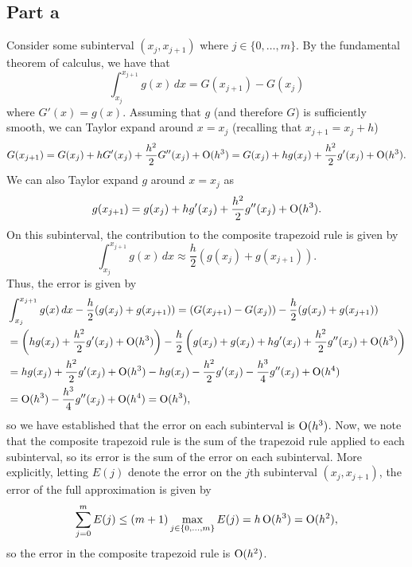 \documentclass{article}
\begin{document}
\subsection{Part a}
Consider some subinterval $(x_j,x_{j+1})$ where $j\in\{0,\ldots,m\}$. By the fundamental theorem of calculus, we have that 
\[
\int_{x_j}^{x_{j+1}} g(x)\,dx=G(x_{j+1})-G(x_j)
\]
where $G'(x)=g(x)$. Assuming that $g$ (and therefore $G$) is sufficiently smooth, we can Taylor expand around $x=x_j$ (recalling that $x_{j+1}=x_j+h$)
\[
G(x_{j+1})=G(x_j)+hG'(x_j)+\frac{h^2}{2}G''(x_j)+\operatorname{O}(h^3)=G(x_j)+hg(x_j)+\frac{h^2}{2}g'(x_j)+\operatorname{O}(h^3).
\]
We can also Taylor expand $g$ around $x=x_j$ as
\[
g(x_{j+1})=g(x_j)+hg'(x_j)+\frac{h^2}{2}g''(x_j)+\operatorname{O}(h^3).
\]
On this subinterval, the contribution to the composite trapezoid rule is given by \[
\int_{x_j}^{x_{j+1}} g(x)\,dx\approx\frac{h}{2}(g(x_{j})+g(x_{j+1})).
\]
Thus, the error is given by 
\begin{align*}
&\int_{x_j}^{x_{j+1}} g(x)\,dx-\frac{h}{2}(g(x_{j})+g(x_{j+1}))=(G(x_{j+1})-G(x_j))-\frac{h}{2}(g(x_{j})+g(x_{j+1}))\\&=
\left(hg(x_j)+\frac{h^2}{2}g'(x_j)+\operatorname{O}(h^3)\right)-\frac{h}{2}\left(g(x_{j})+g(x_j)+hg'(x_j)+\frac{h^2}{2}g''(x_j)+\operatorname{O}(h^3)\right)\\&=
hg(x_j)+\frac{h^2}{2}g'(x_j)+\operatorname{O}(h^3)-hg(x_j)-\frac{h^2}{2}g'(x_j)-\frac{h^3}{4}g''(x_j)+\operatorname{O}(h^4)\\&=
\operatorname{O}(h^3)-\frac{h^3}{4}g''(x_j)+\operatorname{O}(h^4)=\operatorname{O}(h^3),
\end{align*}
so we have established that the error on each subinterval is $\operatorname{O}(h^3)$. Now, we note that the composite trapezoid rule is the sum of the trapezoid rule applied to each subinterval, so its error is the sum of the error on each subinterval. More explicitly, letting $E(j)$ denote the error on the $j$th subinterval $(x_j,x_{j+1})$, the error of the full approximation is given by 
\[
\sum_{j=0}^mE(j)\leq(m+1)\max_{j\in\{0,\ldots,m\}}E(j)=h\operatorname{O}(h^3)=\operatorname{O}(h^2),
\]
so the error in the composite trapezoid rule is $\operatorname{O}(h^2)$.
\end{document}
